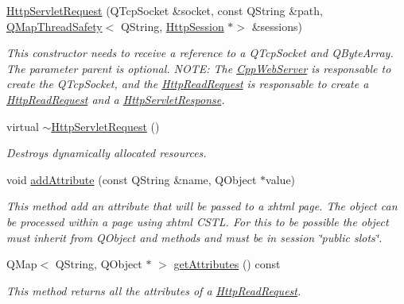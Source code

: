 \begin{DoxyCompactItemize}
\item 
\mbox{\hyperlink{class_http_servlet_request_acda91961621ef7bcd0fe061d0612bc2c}{Http\+Servlet\+Request}} (Q\+Tcp\+Socket \&socket, const Q\+String \&path, \mbox{\hyperlink{class_q_map_thread_safety}{Q\+Map\+Thread\+Safety}}$<$ Q\+String, \mbox{\hyperlink{class_http_session}{Http\+Session}} $\ast$$>$ \&sessions)
\begin{DoxyCompactList}\small\item\em This constructor needs to receive a reference to a Q\+Tcp\+Socket and Q\+Byte\+Array. The parameter parent is optional. N\+O\+TE\+: The \mbox{\hyperlink{class_cpp_web_server}{Cpp\+Web\+Server}} is responsable to create the Q\+Tcp\+Socket, and the \mbox{\hyperlink{class_http_read_request}{Http\+Read\+Request}} is responsable to create a \mbox{\hyperlink{class_http_read_request}{Http\+Read\+Request}} and a \mbox{\hyperlink{class_http_servlet_response}{Http\+Servlet\+Response}}. \end{DoxyCompactList}\item 
\mbox{\label{class_http_servlet_request_aa3ed01e89a6d5390e61c0b0f3e6f83c2}} 
virtual \mbox{\hyperlink{class_http_servlet_request_aa3ed01e89a6d5390e61c0b0f3e6f83c2}{$\sim$\+Http\+Servlet\+Request}} ()
\begin{DoxyCompactList}\small\item\em Destroys dynamically allocated resources. \end{DoxyCompactList}\item 
void \mbox{\hyperlink{class_http_servlet_request_a2537c9716161ea25d83e2aea5b26a945}{add\+Attribute}} (const Q\+String \&name, Q\+Object $\ast$value)
\begin{DoxyCompactList}\small\item\em This method add an attribute that will be passed to a xhtml page. The object can be processed within a page using xhtml C\+S\+TL. For this to be possible the object must inherit from Q\+Object and methods and must be in session \char`\"{}public slots\char`\"{}. \end{DoxyCompactList}\item 
Q\+Map$<$ Q\+String, Q\+Object $\ast$ $>$ \mbox{\hyperlink{class_http_servlet_request_add50206d719a748a2162610fd30f060e}{get\+Attributes}} () const
\begin{DoxyCompactList}\small\item\em This method returns all the attributes of a \mbox{\hyperlink{class_http_read_request}{Http\+Read\+Request}}. \end{DoxyCompactList}\item 
$$
\end{DoxyCompactItemize}
